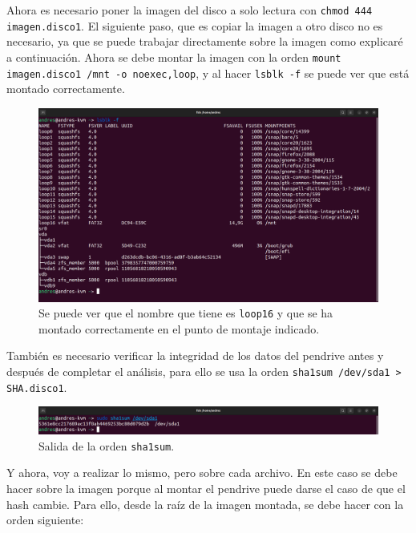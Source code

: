 \documentclass{article}
\begin{document}
Ahora es necesario poner la imagen del disco a solo lectura con \verb|chmod 444 imagen.disco1|. El siguiente paso, que es copiar la imagen a otro disco no es necesario, ya que se puede trabajar directamente sobre la imagen como explicaré a continuación. Ahora se debe montar la imagen con la orden \verb|mount imagen.disco1 /mnt -o noexec,loop|, y al hacer \verb|lsblk -f| se puede ver que está montado correctamente.

\begin{figure}[H]
    \centering
    \includegraphics[width=\textwidth]{imagenes/Captura desde 2022-12-03 21-32-34.png}
    \caption{Se puede ver que el nombre que tiene es \texttt{loop16} y que se ha montado correctamente en el punto de montaje indicado.}
\end{figure}

También es necesario verificar la integridad de los datos del pendrive antes y después de completar el análisis, para ello se usa la orden \verb|sha1sum /dev/sda1 > SHA.disco1|.

\begin{figure}[H]
    \centering
    \includegraphics[width=\textwidth]{imagenes/Captura desde 2022-12-03 21-36-15.png}
    \caption{Salida de la orden \texttt{sha1sum}.}
\end{figure}

Y ahora, voy a realizar lo mismo, pero sobre cada archivo. En este caso se debe hacer sobre la imagen porque al montar el pendrive puede darse el caso de que el hash cambie. Para ello, desde la raíz de la imagen montada, se debe hacer con la orden siguiente: 
\end{document}
